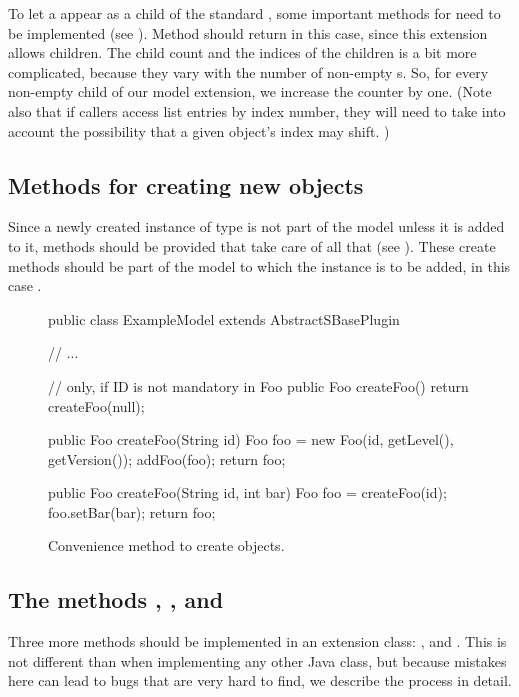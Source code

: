 To let a  appear as a child of the standard \Model, some
important methods for \TreeNode need to be implemented (see
).  Method  should
return  in this case, since this extension allows children.  The
child count and the indices of the children is a bit more complicated,
because they vary with the number of non-empty s.  So, for
every non-empty  child of our model extension, we increase the
counter by one.  (Note also that if callers access list entries by index
number, they will need to take into account the possibility that a given
object's index may shift. )


\subsection{Methods for creating new objects}

Since a newly created instance of type  is not part of the model
unless it is added to it,  methods should be provided that
take care of all that (see ).
These create methods should be part of the model to which the 
instance is to be added, in this case .

\begin{figure}[thb]
  \begin{example}
public class ExampleModel extends AbstractSBasePlugin {

  // ...

  // only, if ID is not mandatory in Foo
  public Foo createFoo() {
    return createFoo(null);
  }

  public Foo createFoo(String id) {
    Foo foo = new Foo(id, getLevel(), getVersion());
    addFoo(foo);
    return foo;
  }

  public Foo createFoo(String id, int bar) {
    Foo foo = createFoo(id);
    foo.setBar(bar);
    return foo;
  }
}\end{example}
  \caption{Convenience method to create  objects.}
  \label{lst:ModelExtCreateMethods}
\end{figure}


\subsection{The methods , , and }

Three more methods should be implemented in an extension
class: ,  and .  This is not
different than when implementing any other Java class, but because mistakes
here can lead to bugs that are very hard to find, we describe the process in
detail.

